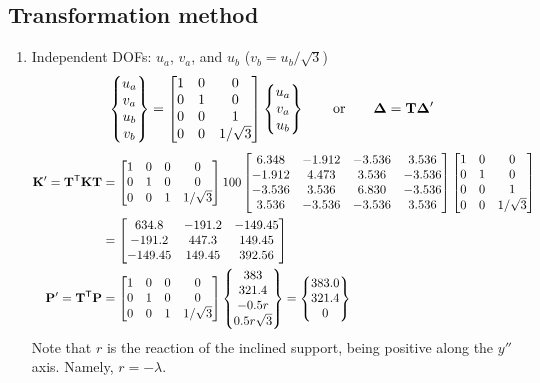 \begin{example}
\subsection*{Transformation method}
{\small
{}
\begin{enumerate}[label=(\arabic*),leftmargin=*]
  \item Independent DOFs: $u_a$, $v_a$, and $u_b$ ($v_b = u_b/\sqrt3$)
    \begin{equation*}
      \begin{Bmatrix}u_a\\ v_a\\ u_b\\ v_b\end{Bmatrix} = \begin{bmatrix}1 & 0 & 0\\ 0 & 1 & 0\\ 0 & 0 & 1\\ 0 & 0 & 1/\sqrt3\end{bmatrix}\begin{Bmatrix}u_a\\ v_a\\ u_b\end{Bmatrix}\qquad\text{or}\qquad \bm{\Delta} = \mathbf{T}\bm{\Delta}'
    \end{equation*}
    \begin{align*}
      \mathbf{K}' = \mathbf{T}^{\mathsf{T}}\mathbf{K}\mathbf{T} &= \begin{bmatrix}1 & 0 & 0 & 0\\ 0 & 1 & 0 & 0\\ 0 & 0 & 1 & 1/\sqrt3\end{bmatrix}100\begin{bmatrix}6.348 & -1.912 & -3.536 & 3.536\\ -1.912 & 4.473 & 3.536 & -3.536\\ -3.536 & 3.536 & 6.830 & -3.536\\ 3.536 & -3.536 & -3.536 & 3.536\end{bmatrix}\begin{bmatrix}1 & 0 & 0\\ 0 & 1 & 0\\ 0 & 0 & 1\\ 0 & 0 & 1/\sqrt3\end{bmatrix}\\
      &= \begin{bmatrix}634.8 & -191.2 & -149.45\\ -191.2 & 447.3 & 149.45\\ -149.45 & 149.45 & 392.56\end{bmatrix}\\
      \mathbf{P}' = \mathbf{T}^{\mathsf{T}}\mathbf{P} &= \begin{bmatrix}1 & 0 & 0 & 0\\ 0 & 1 & 0 & 0\\ 0 & 0 & 1 & 1/\sqrt3\end{bmatrix}\begin{Bmatrix}383\\ 321.4\\ -0.5r\\ 0.5r\sqrt3\end{Bmatrix} = \begin{Bmatrix}383.0\\ 321.4\\ 0\end{Bmatrix}
    \end{align*}
    Note that $r$ is the reaction of the inclined support, being positive along the $y''$ axis. Namely, $r = -\lambda$.

\end{enumerate}}
\end{example}
